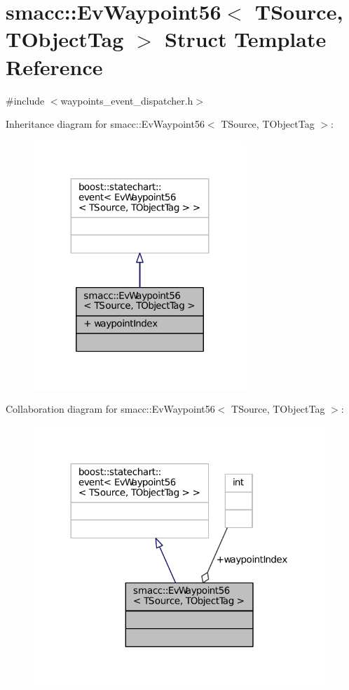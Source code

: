 \hypertarget{structsmacc_1_1EvWaypoint56}{}\section{smacc\+:\+:Ev\+Waypoint56$<$ T\+Source, T\+Object\+Tag $>$ Struct Template Reference}
\label{structsmacc_1_1EvWaypoint56}


{\ttfamily \#include $<$waypoints\+\_\+event\+\_\+dispatcher.\+h$>$}



Inheritance diagram for smacc\+:\+:Ev\+Waypoint56$<$ T\+Source, T\+Object\+Tag $>$\+:
\nopagebreak
\begin{figure}[H]
\begin{center}
\leavevmode
\includegraphics[width=227pt]{structsmacc_1_1EvWaypoint56__inherit__graph}
\end{center}
\end{figure}


Collaboration diagram for smacc\+:\+:Ev\+Waypoint56$<$ T\+Source, T\+Object\+Tag $>$\+:
\nopagebreak
\begin{figure}[H]
\begin{center}
\leavevmode
\includegraphics[width=312pt]{structsmacc_1_1EvWaypoint56__coll__graph}
\end{center}
\end{figure}
